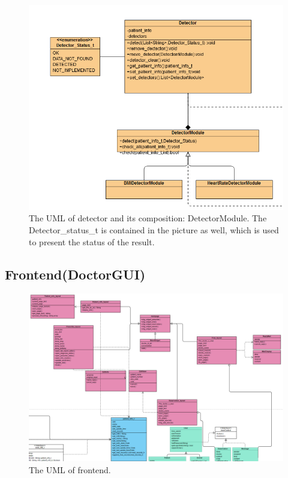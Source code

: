 \documentclass{article}
\begin{document}
\begin{figure}[ht]
  \centering
  \includegraphics[scale = 0.35]{asset/preprocessor_and_detector/PRE_detector.png}
  \caption{The UML of detector and its composition: DetectorModule. The Detector\_status\_t is contained in the picture as well, which is used to present the status of the result.}
  \label{fig:pre_detector}
\end{figure}

\subsection*{Frontend(DoctorGUI)}

\begin{figure}[ht]
    \centering
    \includegraphics[scale = 0.3]{asset/doctor_gui/frontend_uml.png}
    \caption{The UML of frontend.}
    \label{fig:frontend_uml}
  \end{figure}
\end{document}

